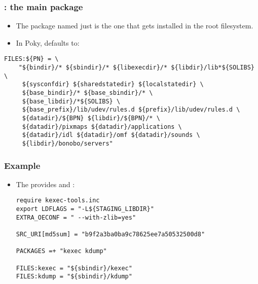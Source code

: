 \begin{frame}[fragile]
  \frametitle{: the main package}
  \begin{itemize}
    \item The package named just  is the one that gets
      installed in the root filesystem.
    \item In Poky, defaults to:
  \end{itemize}
  \begin{block}{}
    \begin{verbatim}
FILES:${PN} = \
    "${bindir}/* ${sbindir}/* ${libexecdir}/* ${libdir}/lib*${SOLIBS} \
     ${sysconfdir} ${sharedstatedir} ${localstatedir} \
     ${base_bindir}/* ${base_sbindir}/* \
     ${base_libdir}/*${SOLIBS} \
     ${base_prefix}/lib/udev/rules.d ${prefix}/lib/udev/rules.d \
     ${datadir}/${BPN} ${libdir}/${BPN}/* \
     ${datadir}/pixmaps ${datadir}/applications \
     ${datadir}/idl ${datadir}/omf ${datadir}/sounds \
     ${libdir}/bonobo/servers"
    \end{verbatim}
  \end{block}
\end{frame}

\begin{frame}[fragile]
  \frametitle{Example}
  \begin{itemize}
    \item The \code{kexec tools} provides \code{kexec} and :
    \begin{block}{}
    \begin{verbatim}
require kexec-tools.inc
export LDFLAGS = "-L${STAGING_LIBDIR}"
EXTRA_OECONF = " --with-zlib=yes"

SRC_URI[md5sum] = "b9f2a3ba0ba9c78625ee7a50532500d8"

PACKAGES =+ "kexec kdump"

FILES:kexec = "${sbindir}/kexec"
FILES:kdump = "${sbindir}/kdump"
    \end{verbatim}
    \end{block}
  \end{itemize}
\end{frame}

